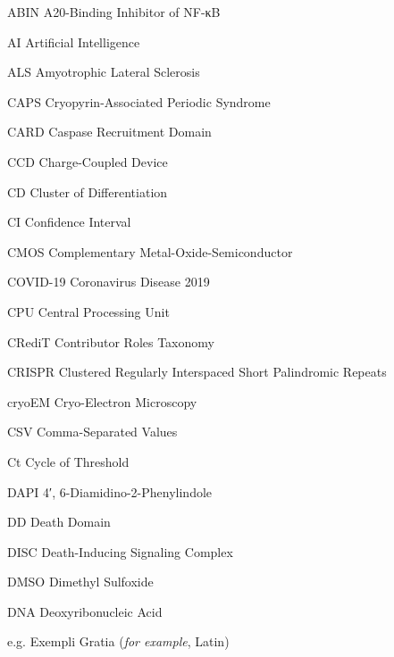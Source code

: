 \makeatletter
{}
\sectionmark{}
\newcommand{\tocfill}{\cleaders\hbox{}\hfill}
\makeatother
\newcommand{\abbrlabel}[1]{\makebox[3cm][l]{\textbf{#1}\ \tocfill}}
\newenvironment{abbreviations}{\begin{list}{}{\renewcommand{\makelabel}{\abbrlabel}%
        \setlength{\labelwidth}{3cm}\setlength{\leftmargin}{\labelwidth+\labelsep}%
                                              \setlength{\itemsep}{0pt}}}{\end{list}}
                     
\begin{spacing}{0.75}
\begin{abbreviations}
\item[ABIN] A20-Binding Inhibitor of NF-κB
\item[AI] Artificial Intelligence
\item[ALS] Amyotrophic Lateral Sclerosis
\item[CAPS] Cryopyrin-Associated Periodic Syndrome
\item[CARD] Caspase Recruitment Domain
\item[CCD] Charge-Coupled Device
\item[CD] Cluster of Differentiation
\item[CI] Confidence Interval
\item[CMOS] Complementary Metal-Oxide-Semiconductor
\item[COVID-19] Coronavirus Disease 2019
\item[CPU] Central Processing Unit
\item[CRediT] Contributor Roles Taxonomy
\item[CRISPR] Clustered Regularly Interspaced Short Palindromic Repeats
\item[cryoEM] Cryo-Electron Microscopy
\item[CSV] Comma-Separated Values
\item[Ct] Cycle of Threshold
\item[DAPI] 4′, 6-Diamidino-2-Phenylindole
\item[DD] Death Domain
\item[DISC] Death-Inducing Signaling Complex
\item[DMSO] Dimethyl Sulfoxide
\item[DNA] Deoxyribonucleic Acid
\item[e.g.] Exempli Gratia (\emph{for example}, Latin)

\end{abbreviations}
\end{spacing}
